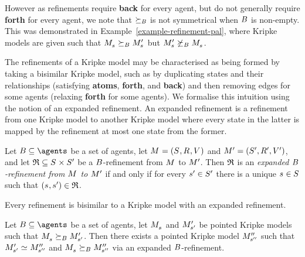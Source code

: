 However as refinements require {\bf back} for every agent, but do not generally require {\bf forth} for every agent, we note that $\succeq_{B}$ is not symmetrical when $B$ is non-empty.
This was demonstrated in Example~\ref{example-refinement-pal}, where Kripke models are given such that  $\kPModel{\kStateS} \simulatesBs \kPModelP{\kStateS}$ but $\kPModelP{\kStateS} \not\simulatesBs \kPModel{\kStateS}$.

The refinements of a Kripke model may be characterised as being formed by taking a bisimilar Kripke model, such as by duplicating states and their relationships (satisfying {\bf atoms}, {\bf forth}, and {\bf back}) and then removing edges for some agents (relaxing {\bf forth} for some agents).
We formalise this intuition using the notion of an expanded refinement.
An expanded refinement is a refinement from one Kripke model to another Kripke model where every state in the latter is mapped by the refinement at most one state from the former.

\pagebreak

\begin{definition}\label{expanded-refinement}
Let $\agentsB \subseteq \agents$ be a set of agents, let $\kModelAndTuple$ and $\kModelAndTupleP$, and let $\refinement \subseteq \kStates \times \kStatesP$ be a $B$-refinement from $\kModel$ to ${M^{\prime}_{}}$.
Then $\mathfrak{R}$ is an {\em expanded $B$-refinement from $\kModel$ to ${M^{\prime}_{}}$} if and only if for every ${s}^{\prime} \in {S^{\prime}}$ there is a unique $\kStateS \in \kStates$ such that $(\kStateS, \kStateSP) \in \refinement$.
\end{definition}

Every refinement is bisimilar to a Kripke model with an expanded refinement.

\begin{lemma}\label{refinement-expansion}
Let $\agentsB \subseteq \agents$ be a set of agents, let $\kPModel{\kStateS}$ and ${M^{\prime}_{{s}^{\prime}}}$ be pointed Kripke models such that $\kPModel{\kStateS} \simulatesBs \kPModelP{\kStateSP}$.
Then there exists a pointed Kripke model ${M^{\prime\prime}_{{s}^{\prime\prime}}}$ such that $\kPModelP{\kStateSP} \bisimilar \kPModelPP{\kStateSPP}$ and $\kPModel{\kStateS} \simulatesBs \kPModelPP{\kStateSPP}$ via an expanded $B$-refinement.
\end{lemma}


